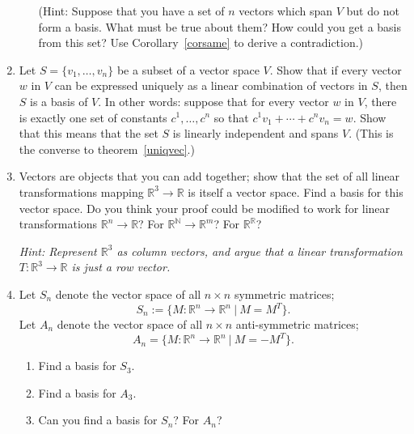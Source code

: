 \begin{enumerate}
\begin{enumerate}
(Hint: Suppose that you have a set of \(n\) vectors which span \(V\) but do not form a basis. What must be true about them? How could you get a basis from this set? Use Corollary~\ref{corsame} to derive a contradiction.)
\end{enumerate}


\item Let $S=\{v_1, \ldots, v_n\}$ be a subset of a vector space $V$.  Show that if every vector $w$ in $V$ can be expressed uniquely as a linear combination of vectors in $S$, then $S$ is a basis of $V$. In other words: suppose that for every vector \(w\) in \(V\), there is exactly one set of constants \(c^1, \ldots, c^n\) so that \(c^1v_1+\cdots+c^nv_n=w\). Show that this means that the set \(S\) is linearly independent and spans \(V\). (This is the converse to theorem~\ref{uniqvec}.)


\item Vectors are objects that you can add together; show that the set of all linear transformations mapping 
$\mathbb{R}^3\rightarrow \mathbb{R}$ is itself a vector space.  Find a basis for this vector space.  Do you think your proof could be modified to work for linear transformations $\mathbb{R}^n\rightarrow \mathbb{R}$? For $\mathbb{R}^{\mathbb{N}}\rightarrow \mathbb{R}^m$? For $\mathbb{R}^\mathbb{R}$?

\emph{Hint: Represent $\mathbb{R}^3$ as column vectors, and argue that a linear transformation $T \colon \mathbb{R}^3\rightarrow \mathbb{R}$ is just a row vector. 
}


\item Let $S_n$ denote the vector space of all $n \times n$ symmetric matrices;  \[S_n:=\{M:\mathbb{R}^n\to \mathbb{R}^n ~ |~ M = M^T\}.\] Let $A_n$ denote the vector space of all $n \times n$ anti-symmetric matrices; 
\[A_n=\{M:\mathbb{R}^n\to \mathbb{R}^n ~ |~ M = -M^T\}.\]
\begin{enumerate}
\item Find a basis for $S_3$.

\item Find a basis for $A_3$.

\item %
Can you find a basis for $S_n$? For $A_n$?


\end{enumerate}
\end{enumerate}
